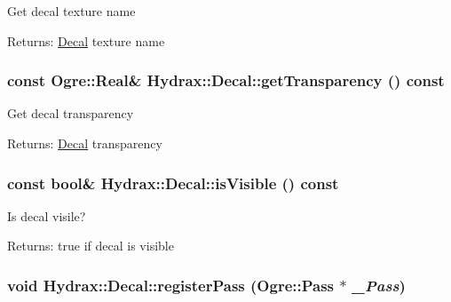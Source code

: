 Get decal texture name \begin{Desc}
\item[Returns:]\hyperlink{class_hydrax_1_1_decal}{Decal} texture name \end{Desc}
\hypertarget{class_hydrax_1_1_decal_92b9f0ae7ac23d87d9fe6415352c87c7}{
\subsubsection[{getTransparency}]{\setlength{\rightskip}{0pt plus 5cm}const Ogre::Real\& Hydrax::Decal::getTransparency () const}}
\label{class_hydrax_1_1_decal_92b9f0ae7ac23d87d9fe6415352c87c7}


Get decal transparency \begin{Desc}
\item[Returns:]\hyperlink{class_hydrax_1_1_decal}{Decal} transparency \end{Desc}
\hypertarget{class_hydrax_1_1_decal_8193d57f867ddb8293da95cd1473af42}{
\subsubsection[{isVisible}]{\setlength{\rightskip}{0pt plus 5cm}const bool\& Hydrax::Decal::isVisible () const}}
\label{class_hydrax_1_1_decal_8193d57f867ddb8293da95cd1473af42}


Is decal visile? \begin{Desc}
\item[Returns:]true if decal is visible \end{Desc}
\hypertarget{class_hydrax_1_1_decal_8c81f3988be73eac2c1c03f947c74ed9}{
\subsubsection[{registerPass}]{\setlength{\rightskip}{0pt plus 5cm}void Hydrax::Decal::registerPass (Ogre::Pass $\ast$ {\em \_\-Pass})}}
\label{class_hydrax_1_1_decal_8c81f3988be73eac2c1c03f947c74ed9}



